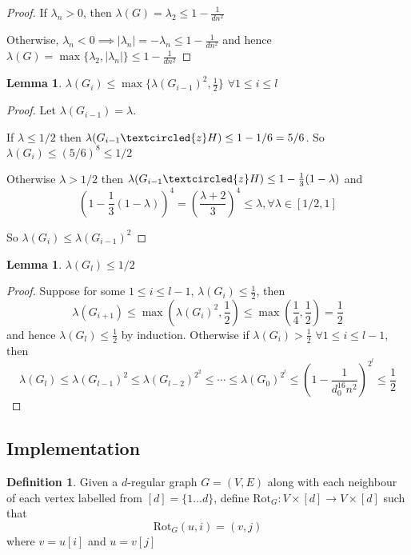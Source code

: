 \documentclass[10pt]{article}
\theoremstyle{plain}
\newtheorem{lemma}[theorem]{Lemma}
\theoremstyle{definition}
\newtheorem{definition}[theorem]{Definition}
\begin{document}
\begin{proof}
If $\lambda_n > 0$, then $\lambda(G) = \lambda_2 \leq 1 - \frac{1}{dn^2}$

Otherwise, $\lambda_n < 0 \implies |\lambda_n| = -\lambda_n \leq 1 - \frac{1}{dn^2}$ and hence $\lambda(G) = \max \{\lambda_2, |\lambda_n|\} \leq 1 - \frac{1}{dn^2}$
\end{proof}

\begin{lemma}
$\lambda(G_i) \leq \max \{\lambda(G_{i-1})^2, \frac12\}$ $\forall 1 \leq i \leq l$
\end{lemma}

\begin{proof}
Let $\lambda(G_{i-1}) = \lambda$.

If $\lambda \leq 1/2$ then $\lambda(G_{i-1} \textcircled{z} H) \leq 1 - 1/6 = 5/6$. So $\lambda(G_i) \leq (5/6)^8 \leq 1/2$

Otherwise $\lambda > 1/2$ then $\lambda(G_{i-1} \textcircled{z} H) \leq 1 - \frac13(1-\lambda)$ and 
$$\left(1 - \frac13(1-\lambda)\right)^4 = \left(\frac{\lambda+2}{3}\right)^4 \leq \lambda, \forall \lambda \in [1/2,1]$$ 

So $\lambda(G_i) \leq \lambda(G_{i-1})^2$
\end{proof}


\begin{lemma}
$\lambda(G_l) \leq 1/2$
\end{lemma}

\begin{proof}
Suppose for some $1 \leq i \leq l-1$, $\lambda(G_i) \leq \frac12$, then $$\lambda(G_{i+1}) \leq \max \left(\lambda(G_{i})^2, \frac12\right) \leq \max \left(\frac14, \frac12\right) = \frac12$$ and hence $\lambda(G_l) \leq \frac12$ by induction. Otherwise if $\lambda(G_i) > \frac12$ $\forall 1 \leq i \leq l-1$, then $$\lambda(G_l) \leq \lambda(G_{l-1})^2 \leq \lambda(G_{l-2})^{2^2} \leq \cdots \leq \lambda(G_0)^{2^l} \leq \left(1 - \frac{1}{d_0^{16}n^2}\right)^{2^l} \leq \frac12$$
\end{proof}


\subsection{Implementation}

\begin{definition}
Given a $d$-regular graph $G = (V,E)$ along with each neighbour of each vertex labelled from $[d] = \{1 \ldots d\}$, define $\text{Rot}_G: V \times [d] \rightarrow V \times [d]$ such that
$$\text{Rot}_G(u,i) = (v,j)$$
where $v=u[i]$ and $u=v[j]$
\end{definition}
\end{document}
